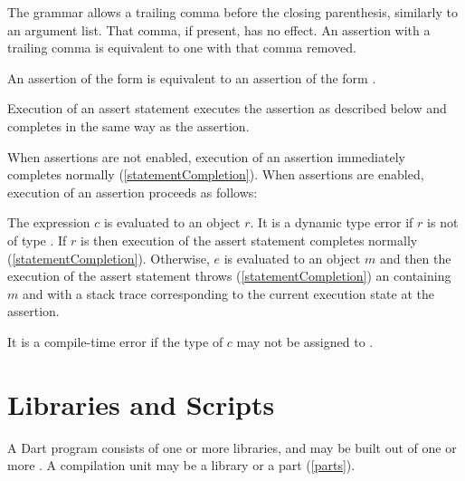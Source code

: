 \documentclass[makeidx]{article}
\begin{document}
{\LMHash{}%
The grammar allows a trailing comma before the closing parenthesis,
similarly to an argument list.
That comma, if present, has no effect.
An assertion with a trailing comma is equivalent to one with that comma removed.

\LMHash{}%
An assertion of the form  is equivalent to
an assertion of the form .

\LMHash{}%
Execution of an assert statement executes the assertion as described below
and completes in the same way as the assertion.

\LMHash{}%
When assertions are not enabled,
execution of an assertion immediately completes normally
(\ref{statementCompletion}).
When assertions are enabled,
execution of an assertion  proceeds as follows:

\LMHash{}%
The expression $c$ is evaluated to an object $r$.
It is a dynamic type error if $r$ is not of type .
If $r$ is \TRUE{} then execution of the assert statement completes normally
(\ref{statementCompletion}).
Otherwise, $e$ is evaluated to an object $m$
and then the execution of the assert statement throws
(\ref{statementCompletion})
an  containing $m$ and with
a stack trace corresponding to the current execution state at the assertion.

\LMHash{}%
It is a compile-time error if the type of $c$
may not be assigned to .



\section{Libraries and Scripts}

\LMHash{}%
A Dart program consists of one or more libraries,
and may be built out of one or more .
A compilation unit may be a library or a part (\ref{parts}).

}
\end{document}
